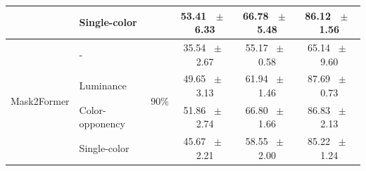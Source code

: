 \begin{table}[h]
\begin{tabular}{@{}l l c c c c@{}}
    & Single-color &  & 53.41 ~$\pm$~ 6.33 & 66.78 ~$\pm$~ 5.48 & 86.12 ~$\pm$~ 1.56 \\
    \midrule
    \multirow{4}{*}{Mask2Former} & - & \multirow{4}{*}{90\%} & 35.54 ~$\pm$~ 2.67 & 55.17 ~$\pm$~ 0.58 & 65.14 ~$\pm$~ 9.60 \\
    & Luminance &  & 49.65 ~$\pm$~ 3.13 & 61.94 ~$\pm$~ 1.46 & 87.69 ~$\pm$~ 0.73 \\
    & Color-opponency &  & 51.86 ~$\pm$~ 2.74 & 66.80 ~$\pm$~ 1.66 & 86.83 ~$\pm$~ 2.13 \\
    & Single-color &  & 45.67 ~$\pm$~ 2.21 & 58.55 ~$\pm$~ 2.00 & 85.22 ~$\pm$~ 1.24 \\
    \midrule
    \bottomrule
  \end{tabular}
  \label{tab:mask2former_acdc_fog}
\end{table}